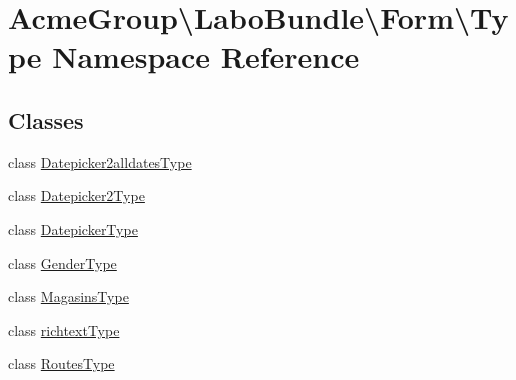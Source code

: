 \hypertarget{namespace_acme_group_1_1_labo_bundle_1_1_form_1_1_type}{\section{Acme\+Group\textbackslash{}Labo\+Bundle\textbackslash{}Form\textbackslash{}Type Namespace Reference}
\label{namespace_acme_group_1_1_labo_bundle_1_1_form_1_1_type}
}
\subsection*{Classes}
\begin{DoxyCompactItemize}
\item 
class \hyperlink{class_acme_group_1_1_labo_bundle_1_1_form_1_1_type_1_1_datepicker2alldates_type}{Datepicker2alldates\+Type}
\item 
class \hyperlink{class_acme_group_1_1_labo_bundle_1_1_form_1_1_type_1_1_datepicker2_type}{Datepicker2\+Type}
\item 
class \hyperlink{class_acme_group_1_1_labo_bundle_1_1_form_1_1_type_1_1_datepicker_type}{Datepicker\+Type}
\item 
class \hyperlink{class_acme_group_1_1_labo_bundle_1_1_form_1_1_type_1_1_gender_type}{Gender\+Type}
\item 
class \hyperlink{class_acme_group_1_1_labo_bundle_1_1_form_1_1_type_1_1_magasins_type}{Magasins\+Type}
\item 
class \hyperlink{class_acme_group_1_1_labo_bundle_1_1_form_1_1_type_1_1richtext_type}{richtext\+Type}
\item 
class \hyperlink{class_acme_group_1_1_labo_bundle_1_1_form_1_1_type_1_1_routes_type}{Routes\+Type}
\end{DoxyCompactItemize}
